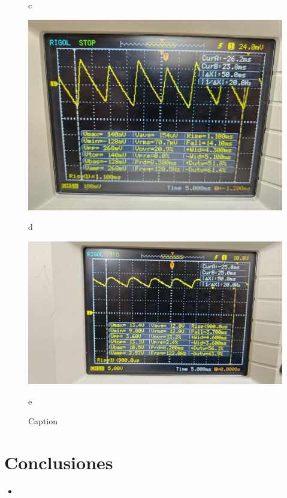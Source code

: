 \documentclass[10pt,letterpaper]{article}
\begin{document}
\begin{figure}[H]
\begin{minipage}[b]{0.45\textwidth}
        \caption*{c}
    \end{minipage}
    \begin{minipage}[b]{0.45\textwidth}
        \centering
        \includegraphics[scale=0.15]{Filtrado6.jpg}
        \caption*{d}
    
    \end{minipage}
    \hfill
    \begin{minipage}[b]{0.45\textwidth}
        \centering
        \includegraphics[scale=0.15]{Filtrado10.jpg}
        \caption*{e}
    \end{minipage}
    \caption{Caption}
    \label{fig:enter-label}
\end{figure}

\section{Conclusiones}
\begin{itemize}
	\item








\end{itemize}

\begin{thebibliography}{9}
\end{thebibliography}
\end{document}
